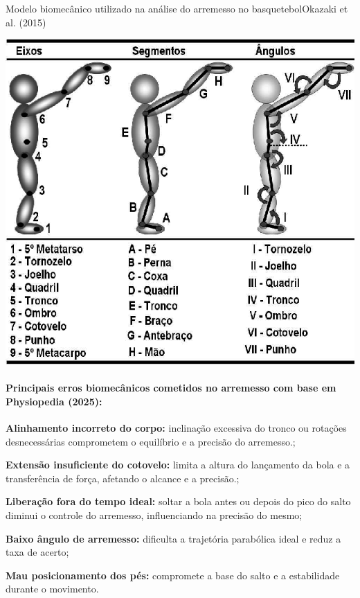 \begin{figura}{Modelo biomecânico utilizado na análise do arremesso no basquetebol}{Okazaki et al. (2015)}
    \begin{flushleft}
        \label{fig:modelo-biomecanico}
        \includegraphics[width=0.55\linewidth]{resources/floats/ilustracoes/modelobiomecanico.png}
    \end{flushleft}
\end{figura}
\FloatBarrier

\paragraph{Principais erros biomecânicos cometidos no arremesso com base em Physiopedia (2025):}
\begin{myitemize}
  \item \textbf{Alinhamento incorreto do corpo:} inclinação excessiva do tronco ou rotações desnecessárias comprometem o equilíbrio e a precisão do arremesso.;
  \item \textbf{Extensão insuficiente do cotovelo:} limita a altura do lançamento da bola e a transferência de força, afetando o alcance e a precisão.;
  \item \textbf{Liberação fora do tempo ideal:} soltar a bola antes ou depois do pico do salto diminui o controle do arremesso, influenciando na precisão do mesmo;
  \item \textbf{Baixo ângulo de arremesso:} dificulta a trajetória parabólica ideal e reduz a taxa de acerto;
  \item \textbf{Mau posicionamento dos pés:} compromete a base do salto e a estabilidade durante o movimento.
\end{myitemize}

